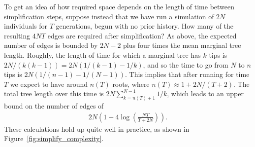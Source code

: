 \documentclass{article}
\begin{document}
To get an idea of how required space depends on the length of time between simplification steps,
suppose instead that we have run a simulation of $2N$ individuals for $T$ generations,
begun with no prior history.
How many of the resulting $4NT$ edges are required after simplification?
As above, the expected number of edges is bounded by $2N-2$ plus four times the mean marginal tree length.
Roughly, the length of time for which a marginal tree has $k$ tips is
$2N/(k(k-1)) = 2N(1/(k-1) - 1/k)$,
and so the time to go from $N$ to $n$ tips is $2N(1/(n-1) - 1/(N-1))$.
This implies that after running for time $T$ we expect to
have around $n(T)$ roots, where $n(T) \approx 1 + 2N/(T+2)$.
The total tree length over this time is
$2 N \sum_{k=n(T)+1}^{N-1} 1/k$, which
leads to an upper bound on the number of edges of
\begin{align}
    \label{eqn:edge_bound}
    2 N \left( 1 + 4 \log\left( \frac{NT}{T + 2 N} \right)\right) .
\end{align}
These calculations hold up quite well in practice,
as shown in Figure~\ref{fig:simplify_complexity}.
\end{document}
